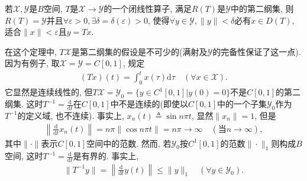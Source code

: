 \documentclass[../../main.tex]{subfiles}%
\begin{document}
\begin{theorem}
若$\mathscr{X},\mathscr{Y}$是$B$空间, $T$是$\mathscr{X}\to\mathscr{Y}$的一个闭线性算子, 满足$R(T)$是$\mathscr{Y}$中的第二纲集, 则$R(T)=\mathscr{Y}$并且$\forall\varepsilon>0,\exists\delta=\delta(\varepsilon)>0$, 使得$\forall y\in\mathscr{Y},\|y\|<\delta$必有$x\in D(T)$, 适合$\|x\|<\varepsilon$且$y=Tx$.
\end{theorem}
\begin{remark}
在这个定理中, $T\mathscr{X}$是第二纲集的假设是不可少的(满射及$\mathscr{Y}$的完备性保证了这一点). 因为有例子, 取$\mathscr{X}=\mathscr{Y}=C[0,1]$, 规定
\begin{align*}
(Tx)(t)=\int_{0}^{t}x(\tau)\mathrm{d}\tau\quad(\forall x\in\mathscr{X}).
\end{align*}
它显然是连续线性的, 但$T\mathscr{X}=\mathscr{Y}_0=\{y\in C^1[0,1]|y(0)=0\}$不是$C[0,1]$的第二纲集. 这时$T^{-1}=\frac{\mathrm{d}}{\mathrm{d}t}$在$C[0,1]$中不是连续的(即使以$C[0,1]$中的一个子集$\mathscr{Y}_0$作为$T^{-1}$的定义域, 也不连续). 事实上, $x_n(t)\triangleq\sin n\pi t$, 显然$\|x_n\|=1$, 但是
\begin{align*}
\left\|\frac{\mathrm{d}}{\mathrm{d}t}x_n(t)\right\|=n\pi\|\cos n\pi t\|=n\pi\to\infty\quad(\text{当}n\to\infty),
\end{align*}
其中$\|\cdot\|$表示$C[0,1]$空间中的范数. 然而, 若$\mathscr{Y}_0$按$C^1[0,1]$的范数$\|\cdot\|_1$则构成$B$空间, 这时$T^{-1}=\frac{\mathrm{d}}{\mathrm{d}t}$是有界的. 事实上,
\begin{align*}
\|T^{-1}y\|=\left\|\frac{\mathrm{d}}{\mathrm{d}t}y(t)\right\|\leqslant\|y\|_1\quad(\forall y\in\mathscr{Y}_0).
\end{align*}
\end{remark}
\end{document}
